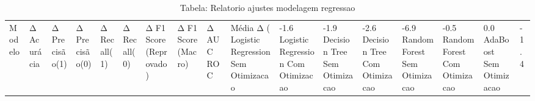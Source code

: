 \begin{table}[H] %
    \centering
    \caption{Tabela: Relatorio ajustes modelagem regressao}
    \label{tab:relatorio_ajustes_modelagem_regressao}
    \renewcommand{\arraystretch}{1.25} %
    \begin{adjustwidth}{ -1in }{ -1in } %
    \centering %
    \small %
    \begin{tabular}{lllllllllll}
\toprule
                            Modelo & Δ Acurácia & Δ Precisão(1) & Δ Precisão(0) & Δ Recall(1) & Δ Recall(0) & Δ F1 Score (Reprovado) & Δ F1 Score (Macro) & Δ AUC ROC & Média Δ (%
\midrule
Logistic Regression Sem Otimizacao &      -1.6%
Logistic Regression Com Otimizacao &      -1.9%
      Decision Tree Sem Otimizacao &      -2.6%
      Decision Tree Com Otimizacao &      -6.9%
      Random Forest Sem Otimizacao &      -0.5%
      Random Forest Com Otimizacao &       0.0%
           AdaBoost Sem Otimizacao &      -1.4%

\end{tabular}
\end{adjustwidth}
\end{table}
